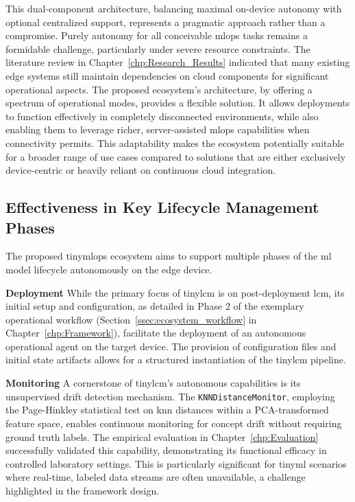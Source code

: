 This dual-component architecture, balancing maximal on-device autonomy with optional centralized support, represents a pragmatic approach rather than a compromise. Purely autonomy for all conceivable \gls{mlops} tasks remains a formidable challenge, particularly under severe resource constraints. The literature review in Chapter~\ref{chp:Research_Results} indicated that many existing edge systems still maintain dependencies on cloud components for significant operational aspects. The proposed ecosystem's architecture, by offering a spectrum of operational modes, provides a flexible solution. It allows deployments to function effectively in completely disconnected environments, while also enabling them to leverage richer, server-assisted \gls{mlops} capabilities when connectivity permits. This adaptability makes the ecosystem potentially suitable for a broader range of use cases compared to solutions that are either exclusively device-centric or heavily reliant on continuous cloud integration.

\subsection{Effectiveness in Key Lifecycle Management Phases}
\label{ssec:effectiveness_lcm_phases}

The proposed \gls{tinymlops} ecosystem aims to support multiple phases of the \gls{ml} model lifecycle autonomously on the edge device.

\textbf{Deployment}\quad
While the primary focus of \gls{tinylcm} is on post-deployment \gls{lcm}, its initial setup and configuration, as detailed in Phase 2 of the exemplary operational workflow (Section~\ref{ssec:ecosystem_workflow} in Chapter~\ref{chp:Framework}), facilitate the deployment of an autonomous operational agent on the target device. The provision of configuration files and initial state artifacts allows for a structured instantiation of the \gls{tinylcm} pipeline. 

\textbf{Monitoring} \quad
A cornerstone of \gls{tinylcm}'s autonomous capabilities is its unsupervised drift detection mechanism. The \texttt{KNNDistanceMonitor}, employing the Page-Hinkley statistical test on  \gls{knn} distances within a PCA-transformed feature space, enables continuous monitoring for concept drift without requiring ground truth labels. The empirical evaluation in Chapter~\ref{chp:Evaluation} successfully validated this capability, demonstrating its functional efficacy in controlled laboratory settings. This is particularly significant for \gls{tinyml} scenarios where real-time, labeled data streams are often unavailable, a challenge highlighted in the framework design. 

